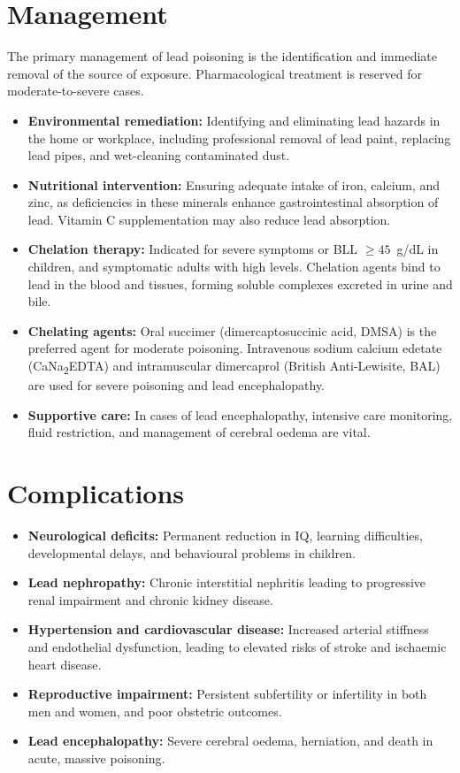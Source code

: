 \section*{Management}
The primary management of lead poisoning is the identification and immediate removal of the source of exposure. Pharmacological treatment is reserved for moderate-to-severe cases.
\begin{itemize}
    \item \textbf{Environmental remediation:} Identifying and eliminating lead hazards in the home or workplace, including professional removal of lead paint, replacing lead pipes, and wet-cleaning contaminated dust.
    \item \textbf{Nutritional intervention:} Ensuring adequate intake of iron, calcium, and zinc, as deficiencies in these minerals enhance gastrointestinal absorption of lead. Vitamin C supplementation may also reduce lead absorption.
    \item \textbf{Chelation therapy:} Indicated for severe symptoms or BLL $\ge 45$~\textmu{}g/dL in children, and symptomatic adults with high levels. Chelation agents bind to lead in the blood and tissues, forming soluble complexes excreted in urine and bile.
    \item \textbf{Chelating agents:} Oral succimer (dimercaptosuccinic acid, DMSA) is the preferred agent for moderate poisoning. Intravenous sodium calcium edetate (CaNa\textsubscript{2}EDTA) and intramuscular dimercaprol (British Anti-Lewisite, BAL) are used for severe poisoning and lead encephalopathy.
    \item \textbf{Supportive care:} In cases of lead encephalopathy, intensive care monitoring, fluid restriction, and management of cerebral oedema are vital.
\end{itemize}

\section*{Complications}
\begin{itemize}
    \item \textbf{Neurological deficits:} Permanent reduction in IQ, learning difficulties, developmental delays, and behavioural problems in children.
    \item \textbf{Lead nephropathy:} Chronic interstitial nephritis leading to progressive renal impairment and chronic kidney disease.
    \item \textbf{Hypertension and cardiovascular disease:} Increased arterial stiffness and endothelial dysfunction, leading to elevated risks of stroke and ischaemic heart disease.
    \item \textbf{Reproductive impairment:} Persistent subfertility or infertility in both men and women, and poor obstetric outcomes.
    \item \textbf{Lead encephalopathy:} Severe cerebral oedema, herniation, and death in acute, massive poisoning.
\end{itemize}

